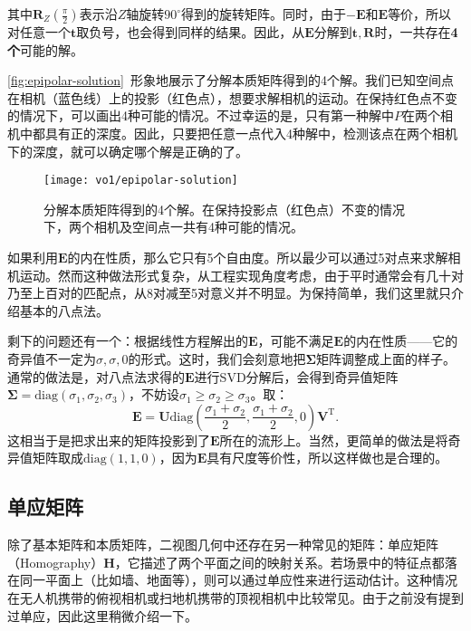 其中$\bm{R}_Z\left(\frac{\pi }{2}\right)$表示沿$Z$轴旋转$90^\circ$得到的旋转矩阵。同时，由于$-\bm{E}$和$\bm{E}$等价，所以对任意一个$\bm{t}$取负号，也会得到同样的结果。因此，从$\bm{E}$分解到$\bm{t}, \bm{R}$时，一共存在\textbf{4个}可能的解。

\autoref{fig:epipolar-solution}~形象地展示了分解本质矩阵得到的4个解。我们已知空间点在相机（蓝色线）上的投影（红色点），想要求解相机的运动。在保持红色点不变的情况下，可以画出4种可能的情况。不过幸运的是，只有第一种解中$P$在两个相机中都具有正的深度。因此，只要把任意一点代入4种解中，检测该点在两个相机下的深度，就可以确定哪个解是正确的了。

\begin{figure}[!htp]
	\centering
	\texttt{[image: vo1/epipolar-solution]}
	\caption{分解本质矩阵得到的4个解。在保持投影点（红色点）不变的情况下，两个相机及空间点一共有4种可能的情况。}
	\label{fig:epipolar-solution}
\end{figure}

如果利用$\bm{E}$的内在性质，那么它只有5个自由度。所以最少可以通过5对点来求解相机运动\textsuperscript{\cite{Li2006, Nister2004a}}。然而这种做法形式复杂，从工程实现角度考虑，由于平时通常会有几十对乃至上百对的匹配点，从8对减至5对意义并不明显。为保持简单，我们这里就只介绍基本的八点法。

剩下的问题还有一个：根据线性方程解出的$\bm{E}$，可能不满足$\bm{E}$的内在性质——它的奇异值不一定为${\sigma}, {\sigma}, 0$的形式。这时，我们会刻意地把$\bm{\Sigma}$矩阵调整成上面的样子。通常的做法是，对八点法求得的$\bm{E}$进行SVD分解后，会得到奇异值矩阵$\bm{\Sigma} =  \mathrm{diag} ( \sigma_1, \sigma_2, \sigma_3)$，不妨设$\sigma_1 \geqslant \sigma_2 \geqslant \sigma_3$。取：
\begin{equation}
\bm{E} = \bm{U} \mathrm{diag} (\frac{\sigma_1+\sigma_2}{2}, \frac{\sigma_1+\sigma_2}{2}, 0) \bm{V}^\mathrm{T}.
\end{equation}
这相当于是把求出来的矩阵投影到了$\bm{E}$所在的流形上。当然，更简单的做法是将奇异值矩阵取成$\mathrm{diag} (1,1,0)$，因为$\bm{E}$具有尺度等价性，所以这样做也是合理的。

\subsection{单应矩阵}
除了基本矩阵和本质矩阵，二视图几何中还存在另一种常见的矩阵：单应矩阵（Homography）$\bm{H}$，它描述了两个平面之间的映射关系。若场景中的特征点都落在同一平面上（比如墙、地面等），则可以通过单应性来进行运动估计。这种情况在无人机携带的俯视相机或扫地机携带的顶视相机中比较常见。由于之前没有提到过单应，因此这里稍微介绍一下。

